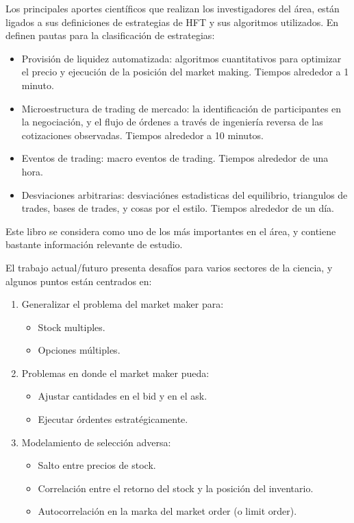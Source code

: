 Los principales aportes científicos que realizan los investigadores del área, están ligados a sus definiciones de estrategias de HFT y sus algoritmos utilizados. En
\cite{aldridge2009high} definen pautas para la clasificación de estrategias:
\begin{itemize}
	\item Provisión de liquidez automatizada: algoritmos cuantitativos para optimizar el precio y ejecución de la posición del market making. Tiempos alrededor a
		1 minuto.
	\item Microestructura de trading de mercado: la identificación de participantes en la negociación, y el flujo de órdenes a través de ingeniería reversa de 
		las cotizaciones observadas. Tiempos alrededor a 10 minutos.
	\item Eventos de trading: macro eventos de trading. Tiempos alrededor de una hora.
	\item Desviaciones arbitrarias: desviaciónes estadisticas del equilibrio, triangulos de trades, bases de trades, y cosas por el estilo. Tiempos alrededor
		de un día.
\end{itemize}

Este libro se considera como uno de los más importantes en el área, y contiene bastante información relevante de estudio.

El trabajo actual/futuro presenta desafíos para varios sectores de la ciencia, y algunos puntos están centrados en: \cite{avellaneda2008high}
\begin{enumerate}
	\item Generalizar el problema del market maker para:
		\begin{itemize}
			\item Stock multiples.
			\item Opciones múltiples.
		\end{itemize}
	\item Problemas en donde el market maker pueda:
		\begin{itemize}
			\item Ajustar cantidades en el bid y en el ask.
			\item Ejecutar órdentes estratégicamente.
		\end{itemize}	
	\item Modelamiento de selección adversa:
		\begin{itemize}
			\item Salto entre precios de stock.
			\item Correlación entre el retorno del stock y la posición del inventario.
			\item Autocorrelación en la marka del market order (o limit order).
		\end{itemize}
\end{enumerate}

